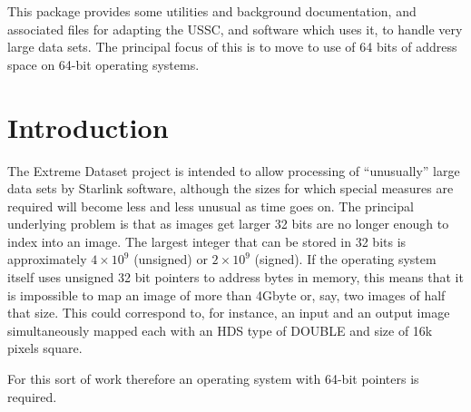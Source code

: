 \documentclass[twoside,11pt]{article}
\newcommand{\stardocinitials}  {SSN}
\newcommand{\stardocnumber}    {73.1}
\newcommand{\stardocabstract}  {
This package provides some utilities and background documentation,
and associated files
for adapting the USSC, and software which uses it, 
to handle very large data sets.
The principal focus of this is to move to use of 64 bits of address
space on 64-bit operating systems.
}
\newcommand{\stardocname}{\stardocinitials /\stardocnumber}
\newcommand{\htmlref}[2]{#1}
\newenvironment{latexonly}{}{}
\renewcommand{\_}{\texttt{\symbol{95}}}
\renewcommand{\thepage}{\roman{page}}
\begin{document}
\stardocabstract
  \newpage
  \begin{latexonly}
    \setlength{\parskip}{0mm}
    \tableofcontents
    \setlength{\parskip}{\medskipamount}
    \markboth{\stardocname}{\stardocname}
  \end{latexonly}
\cleardoublepage
\renewcommand{\thepage}{\arabic{page}}
\setcounter{page}{1}





\newcommand{\xroutine}[1]{\htmlref{{\tt #1}}{#1}}
\newcommand{\file}[1]{{\tt #1}}
\newcommand{\routine}[1]{{\tt #1}}
\newcommand{\cc}[1]{{\tt #1}}
\newenvironment{squote}{\begin{quote}\begin{small}}{\end{small}\end{quote}}

\section{Introduction}

The Extreme Dataset project is intended to allow processing of ``unusually''
large data sets by Starlink software, 
although the sizes for which special measures
are required will become less and less unusual as time goes on.
The principal underlying problem is that as images get larger
32 bits are no longer enough to index into an image.
The largest integer that can be stored in 32 bits 
is approximately $4 \times 10^9$ (unsigned) or $2 \times 10^9$ (signed).
If the operating system itself uses unsigned 32 bit pointers to 
address bytes
in memory, this means that it is impossible to map an image of more
than 4Gbyte or, say, two images of half that size. 
This could correspond to, for instance, an input and an output image
simultaneously mapped each with an HDS type of \_DOUBLE and 
size of 16k pixels square.

For this sort of work therefore an operating system with 64-bit 
pointers is required.
\end{document}
